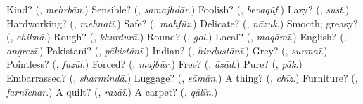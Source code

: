 \begin{tcolorbox}[breakable,colback=teal!4,colframe=teal!35!black,title={Before you move on}]
Kind? (\textbf{}, \emph{mehrbān}.) Sensible? (\textbf{}, \emph{samajhdār}.) Foolish? (\textbf{}, \emph{bevaqūf}.) Lazy? (\textbf{}, \emph{sust}.) Hardworking? (\textbf{}, \emph{mehnatī}.) Safe? (\textbf{}, \emph{mahfūz}.) Delicate? (\textbf{}, \emph{nāzuk}.) Smooth; greasy? (\textbf{}, \emph{chiknā}.) Rough? (\textbf{}, \emph{khurdurā}.) Round? (\textbf{}, \emph{gol}.) Local? (\textbf{}, \emph{maqāmī}.) English? (\textbf{}, \emph{angrezī}.) Pakistani? (\textbf{}, \emph{pākistānī}.) Indian? (\textbf{}, \emph{hindustānī}.) Grey? (\textbf{}, \emph{surmaī}.) Pointless? (\textbf{}, \emph{fuzūl}.) Forced? (\textbf{}, \emph{majbūr}.) Free? (\textbf{}, \emph{āzād}.) Pure? (\textbf{}, \emph{pāk}.) Embarrassed? (\textbf{}, \emph{sharmindā}.) Luggage? (\textbf{}, \emph{sāmān}.) A thing? (\textbf{}, \emph{chīz}.) Furniture? (\textbf{}, \emph{farnīchar}.) A quilt? (\textbf{}, \emph{razāī}.) A carpet? (\textbf{}, \emph{qālīn}.)
\end{tcolorbox}
